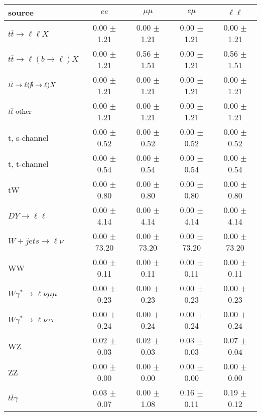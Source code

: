 \begin{tabular}{l|cccc} \hline\hline
source & $ee$ & $\mu\mu$ & $e\mu$ & $\ell\ell $ \\
\hline
$t\overline{t} \rightarrow \ell \ell X$ &  0.00 $\pm$  1.21 &  0.00 $\pm$  1.21 &  0.00 $\pm$  1.21 &  0.00 $\pm$  1.21 \\
$t\overline{t} \rightarrow \ell (b \rightarrow \ell) X$ &  0.00 $\pm$  1.21 &  0.56 $\pm$  1.51 &  0.00 $\pm$  1.21 &  0.56 $\pm$  1.51 \\
$t\overline{t} \rightarrow \ell (\slashed b \rightarrow \ell) X$ &  0.00 $\pm$  1.21 &  0.00 $\pm$  1.21 &  0.00 $\pm$  1.21 &  0.00 $\pm$  1.21 \\
        $t\overline{t}\ \rm{other}$ &  0.00 $\pm$  1.21 &  0.00 $\pm$  1.21 &  0.00 $\pm$  1.21 &  0.00 $\pm$  1.21 \\
\hline
                       t, s-channel &  0.00 $\pm$  0.52 &  0.00 $\pm$  0.52 &  0.00 $\pm$  0.52 &  0.00 $\pm$  0.52 \\
                       t, t-channel &  0.00 $\pm$  0.54 &  0.00 $\pm$  0.54 &  0.00 $\pm$  0.54 &  0.00 $\pm$  0.54 \\
                                 tW &  0.00 $\pm$  0.80 &  0.00 $\pm$  0.80 &  0.00 $\pm$  0.80 &  0.00 $\pm$  0.80 \\
\hline
         $DY \rightarrow \ell \ell$ &  0.00 $\pm$  4.14 &  0.00 $\pm$  4.14 &  0.00 $\pm$  4.14 &  0.00 $\pm$  4.14 \\
      $W+jets \rightarrow \ell \nu$ &  0.00 $\pm$ 73.20 &  0.00 $\pm$ 73.20 &  0.00 $\pm$ 73.20 &  0.00 $\pm$ 73.20 \\
                                 WW &  0.00 $\pm$  0.11 &  0.00 $\pm$  0.11 &  0.00 $\pm$  0.11 &  0.00 $\pm$  0.11 \\
\hline
$W\gamma^{*} \rightarrow \ell \nu \mu\mu$ &  0.00 $\pm$  0.23 &  0.00 $\pm$  0.23 &  0.00 $\pm$  0.23 &  0.00 $\pm$  0.23 \\
$W\gamma^{*} \rightarrow \ell \nu \tau\tau$ &  0.00 $\pm$  0.24 &  0.00 $\pm$  0.24 &  0.00 $\pm$  0.24 &  0.00 $\pm$  0.24 \\
                                 WZ &  0.02 $\pm$  0.03 &  0.02 $\pm$  0.03 &  0.03 $\pm$  0.03 &  0.07 $\pm$  0.04 \\
                                 ZZ &  0.00 $\pm$  0.00 &  0.00 $\pm$  0.00 &  0.00 $\pm$  0.00 &  0.00 $\pm$  0.00 \\
\hline
              $t\overline{t}\gamma$ &  0.03 $\pm$  0.07 &  0.00 $\pm$  1.08 &  0.16 $\pm$  0.11 &  0.19 $\pm$  0.12 \\

\end{tabular}
